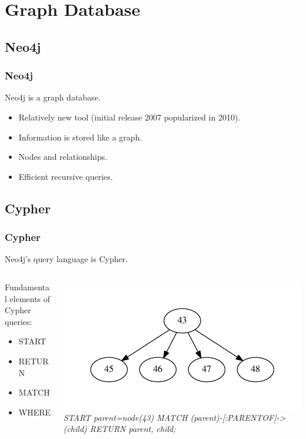 \documentclass{beamer}
\begin{document}
\section[Graph DB]{Graph Database}
\subsection{Neo4j}

\begin{frame}
	\frametitle{Neo4j}
	
	Neo4j is a graph database.
		\begin{itemize}
		\item Relatively new tool (initial release 2007 popularized in 2010).
		\item Information is stored like a graph.
		\item Nodes and relationships.
		\item Efficient recursive queries.
		\end{itemize}

\end{frame}

\subsection{Cypher}

\begin{frame}
	\frametitle{Cypher}
	Neo4j's query language is Cypher.
	\begin{columns}
	\begin{column}{0.40\textwidth}

	Fundamental elements of Cypher queries:
		\begin{itemize}
		\item START
		\item RETURN
		\item MATCH
		\item WHERE
		\end{itemize}
	\end{column}
	\begin{column}{0.60\textwidth}

	\includegraphics[width=.95\textwidth]{parents.pdf}
	\linebreak
	\emph{
START parent=node(43)
\linebreak
MATCH (parent)-[:PARENTOF]->(child)
\linebreak
RETURN parent, child;
}

	\end{column}	
	\end{columns}
\end{frame}
\end{document}
